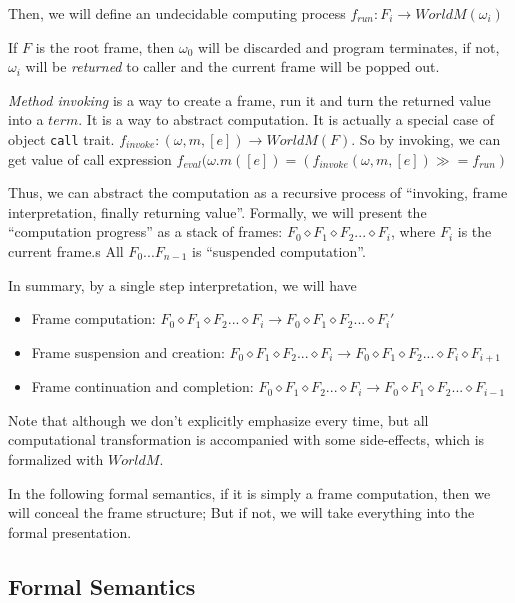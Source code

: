 \documentclass[]{article}
\numberwithin{equation}{section}
\numberwithin{figure}{section}
\numberwithin{table}{section}
\begin{document}
Then, we will define an undecidable computing process
$f_{run}: F_i \rightarrow WorldM(\omega_{i})$

If $F$ is the root frame, then $\omega_0$ will be discarded and program
terminates, if not, $\omega_i$ will be \emph{returned} to caller and the
current frame will be popped out.

\emph{Method invoking} is a way to create a frame, run it and turn the
returned value into a $term$. It is a way to abstract computation. It is
actually a special case of object \texttt{call} trait.
$f_{invoke}: (\omega, m, [e]) \rightarrow WorldM(F)$. So by invoking, we can get
value of call expression
$f_{eval}{(\omega.m([e])} = (f_{invoke}(\omega, m, [e]) \gg = f_{run})$

Thus, we can abstract the computation as a recursive process of
``invoking, frame interpretation, finally returning value''. Formally, we will present the ``computation progress'' as a stack
of frames: $F_0 \diamond F_1 \diamond F_2 ... \diamond F_i$, where $F_i$
is the current frame.s All $F_0 ... F_{n - 1}$ is ``suspended
computation''.

In summary, by a single step interpretation, we will have

\begin{itemize}
\itemsep1pt\parskip0pt
\item
  Frame computation:
  $F_0 \diamond F_1 \diamond F_2 ... \diamond F_i \rightarrow F_0 \diamond F_1 \diamond F_2 ... \diamond F_i'$
\item
  Frame suspension and creation:
  $F_0 \diamond F_1 \diamond F_2 ... \diamond F_i \rightarrow F_0 \diamond F_1 \diamond F_2 ... \diamond F_i \diamond F_{i + 1}$
\item
  Frame continuation and completion:
  $F_0 \diamond F_1 \diamond F_2 ... \diamond F_i \rightarrow F_0 \diamond F_1 \diamond F_2 ... \diamond F_{i - 1}$
\end{itemize}

Note that although we don't explicitly emphasize every time,
but all computational transformation is accompanied with some side-effects,
which is formalized with $WorldM$.

In the following formal semantics, if it is simply a frame computation,
then we will conceal the frame structure; But if not, we will take
everything into the formal presentation.

\subsection{Formal Semantics}\label{formal-semantics}
\end{document}
